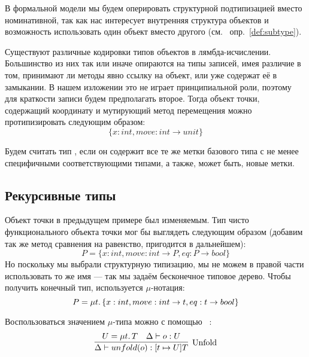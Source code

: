 В формальной модели мы будем оперировать структурной подтипизацией вместо номинативной, так как нас интересует внутренняя структура объектов и возможность использовать один объект вместо другого (см.
~опр.~\ref{def:subtype}).

Существуют различные кодировки типов объектов в лямбда-исчислении.
Большинство из них так или иначе опираются на типы записей, имея различие в том, принимают ли методы явно ссылку на объект, или уже содержат её в замыкании.
В нашем изложении это не играет принципиальной роли, поэтому для краткости записи будем предполагать второе.
Тогда объект точки, содержащий координату и мутирующий метод перемещения можно протипизировать следующим образом:
\begin{equation}
    \label{eq:mutable-point}
    \{ x : int, move : int \to unit \}
\end{equation}

Будем считать тип , если он содержит все те же метки базового типа с не менее специфичными соответствующими типами, а также, может быть, новые метки.


\subsection{Рекурсивные типы} \label{subsec:recursive-types}

Объект точки в предыдущем примере был изменяемым.
Тип чисто функционального объекта точки мог бы выглядеть следующим образом (добавим так же метод сравнения на равенство, пригодится в дальнейшем):
\begin{equation*}
    P = \{ x : int, move : int \to P, eq : P \to bool \}
\end{equation*}
Но поскольку мы выбрали структурную типизацию, мы не можем в правой части использовать то же имя --- так мы задаём бесконечное типовое дерево.
Чтобы получить конечный тип, используется $\mu$-нотация:
\begin{equation}
    \label{eq:P}
    P = \mu t \ldotp \{ x : int, move : int \to t, eq : t \to bool \}
\end{equation}

Воспользоваться значением $\mu$-типа можно с помощью ~\cite{cook1989inheritance}:
\begin{equation}
    \label{eq:unfold}
    \infer[\text{Unfold}]{
        \Delta \vdash unfold(o) : [t \mapsto U]T
    }{
        U = \mu t \ldotp T & \Delta \vdash o : U
    }
\end{equation}

